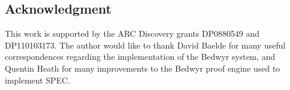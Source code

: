 \documentclass{article}
\newcommand\obj[1]{\texttt{#1}}
\begin{document}


\subsection*{Acknowledgment}
This work is supported by the ARC Discovery grants DP0880549 and DP110103173.
The author would like to thank David Baelde for many useful correspondences 
regarding the implementation of the Bedwyr system, and Quentin Heath for 
many improvements to the Bedwyr proof engine used to implement SPEC.


\end{document}
